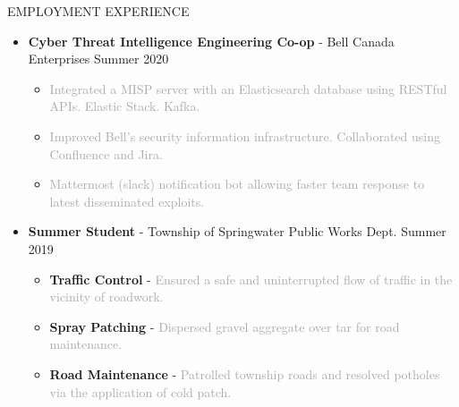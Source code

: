\documentclass{resume} %
\begin{document}
\begin{rSection}{EMPLOYMENT EXPERIENCE}
\begin{itemize}
\begin{itemize}[topsep=-10pt]
        \end{itemize}
        \item {\bf Cyber Threat Intelligence Engineering Co-op} - Bell Canada Enterprises \hfill {Summer 2020}
        \begin{itemize}[topsep=-10pt]
            \setlength\itemsep{-0.5em}
            \item[\textbullet] \textcolor{darkgray}{Integrated a MISP server with an Elasticsearch database using RESTful APIs. Elastic Stack. Kafka.}
            \item[\textbullet] \textcolor{darkgray}{Improved Bell's security information infrastructure. Collaborated using Confluence and Jira.}
            \item[\textbullet] \textcolor{darkgray}{Mattermost (slack) notification bot allowing faster team response to latest disseminated exploits.}
        \end{itemize}
        \item {\bf Summer Student} - Township of Springwater Public Works Dept. \hfill {Summer 2019}
        \begin{itemize}[topsep=-10pt]
            \setlength\itemsep{-0.5em}
            \item[\textbullet] {\bf Traffic Control} - \textcolor{darkgray}{Ensured a safe and uninterrupted flow of traffic in the vicinity of roadwork.}
            \item[\textbullet] {\bf Spray Patching} - \textcolor{darkgray}{Dispersed gravel aggregate over tar for road maintenance.}
            \item[\textbullet] {\bf Road Maintenance} - \textcolor{darkgray}{Patrolled township roads and resolved potholes via the application of cold patch.}
        \end{itemize}
    \end{itemize}
\end{rSection}
\end{document}
